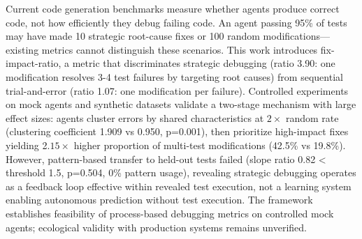 
Current code generation benchmarks measure whether agents produce correct code, not how efficiently they debug failing code. An agent passing 95\% of tests may have made 10 strategic root-cause fixes or 100 random modifications---existing metrics cannot distinguish these scenarios. This work introduces fix-impact-ratio, a metric that discriminates strategic debugging (ratio 3.90: one modification resolves 3-4 test failures by targeting root causes) from sequential trial-and-error (ratio 1.07: one modification per failure). Controlled experiments on mock agents and synthetic datasets validate a two-stage mechanism with large effect sizes: agents cluster errors by shared characteristics at $2\times$ random rate (clustering coefficient 1.909 vs 0.950, p=0.001), then prioritize high-impact fixes yielding 2.$15\times$ higher proportion of multi-test modifications (42.5\% vs 19.8\%). However, pattern-based transfer to held-out tests failed (slope ratio 0.82 < threshold 1.5, p=0.504, 0\% pattern usage), revealing strategic debugging operates as a feedback loop effective within revealed test execution, not a learning system enabling autonomous prediction without test execution. The framework establishes feasibility of process-based debugging metrics on controlled mock agents; ecological validity with production systems remains unverified.

